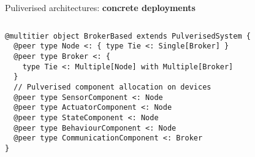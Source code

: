 \begin{frame}[fragile]{Puliverised architectures: \textbf{concrete deployments}}
  \begin{columns}
    \begin{column}{0.7\textwidth}
      \begin{cardTiny}
        \begin{verbatim}
@multitier object BrokerBased extends PulverisedSystem {
  @peer type Node <: { type Tie <: Single[Broker] }
  @peer type Broker <: { 
    type Tie <: Multiple[Node] with Multiple[Broker] 
  }
  // Pulverised component allocation on devices
  @peer type SensorComponent <: Node
  @peer type ActuatorComponent <: Node
  @peer type StateComponent <: Node
  @peer type BehaviourComponent <: Node
  @peer type CommunicationComponent <: Broker
}
        \end{verbatim}
      \end{cardTiny}
    \end{column}
    \begin{column}{0.3\textwidth}
    \end{column}
  \end{columns}
\end{frame}